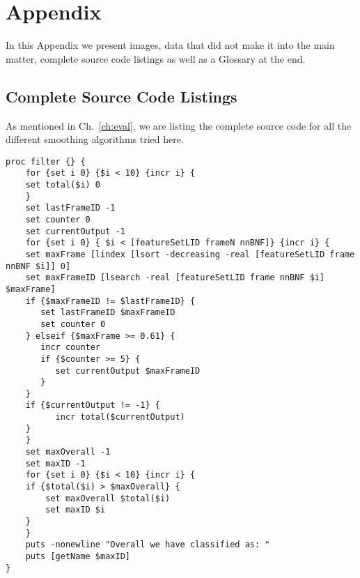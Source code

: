 


\chapter{Appendix}
\label{chap:appendix}
In this Appendix we present images, data that did not make it into the main matter, complete source code listings as well as a Glossary at the end.

\section{Complete Source Code Listings}

As mentioned in Ch.~\ref{ch:eval}, we are listing the complete source code for all the different smoothing algorithms tried here.

\begin{lstlisting}[label=lst:BasicFilter,caption=Basic (first try) Filter employed to smooth/improve output]
proc filter {} {
    for {set i 0} {$i < 10} {incr i} {
    set total($i) 0
    }
    set lastFrameID -1
    set counter 0
    set currentOutput -1
    for {set i 0} { $i < [featureSetLID frameN nnBNF]} {incr i} {
    set maxFrame [lindex [lsort -decreasing -real [featureSetLID frame nnBNF $i]] 0]
    set maxFrameID [lsearch -real [featureSetLID frame nnBNF $i] $maxFrame]
    if {$maxFrameID != $lastFrameID} {
       set lastFrameID $maxFrameID
       set counter 0
    } elseif {$maxFrame >= 0.61} {
       incr counter
       if {$counter >= 5} {
          set currentOutput $maxFrameID
       }
    }
    if {$currentOutput != -1} {
          incr total($currentOutput)
    }
    }
    set maxOverall -1
    set maxID -1
    for {set i 0} {$i < 10} {incr i} {
    if {$total($i) > $maxOverall} {
        set maxOverall $total($i)
        set maxID $i
    }
    }
    puts -nonewline "Overall we have classified as: "
    puts [getName $maxID]
}
\end{lstlisting}



